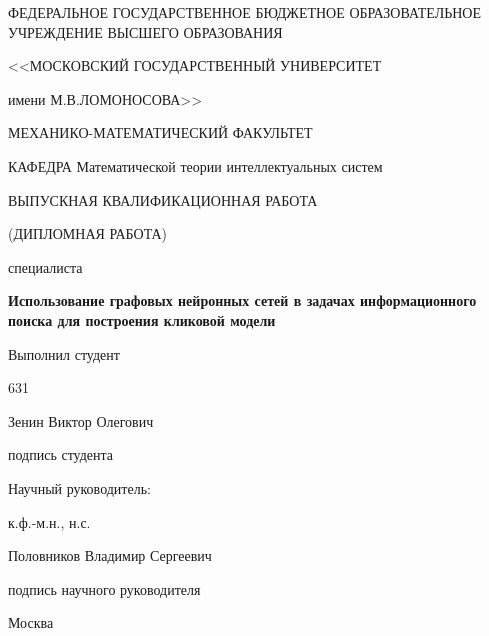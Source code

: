 \begin{titlepage}
  \begin{center}
    ФЕДЕРАЛЬНОЕ ГОСУДАРСТВЕННОЕ БЮДЖЕТНОЕ ОБРАЗОВАТЕЛЬНОЕ УЧРЕЖДЕНИЕ ВЫСШЕГО ОБРАЗОВАНИЯ

    <<МОСКОВСКИЙ ГОСУДАРСТВЕННЫЙ УНИВЕРСИТЕТ

    имени М.В.ЛОМОНОСОВА>>

    \vspace{0.7cm}

    МЕХАНИКО-МАТЕМАТИЧЕСКИЙ ФАКУЛЬТЕТ

    \vspace{0.7cm}

    КАФЕДРА Математической теории интеллектуальных систем 

    \vspace{3cm}

    ВЫПУСКНАЯ КВАЛИФИКАЦИОННАЯ РАБОТА
  
    (ДИПЛОМНАЯ РАБОТА)
  
    специалиста

    \vspace{0.7cm}

    \textbf{Использование графовых нейронных сетей в задачах информационного поиска для построения кликовой модели}

  \end{center}

  \vspace{2cm}

  \hfill
  \begin{minipage}{0.5\textwidth}
    Выполнил студент

    631

    Зенин Виктор Олегович

    \vspace{1cm}

    \underline{\hspace{4cm}}

    подпись студента

    \vspace{0.5cm}

    Научный руководитель:

    к.ф.-м.н., н.с.

    Половников Владимир Сергеевич

    \vspace{1cm}

    \underline{\hspace{4cm}}

    подпись научного руководителя
 \end{minipage}

  \vfill

  \begin{center}
    \large Москва

    \the\year
  \end{center}

\end{titlepage}
